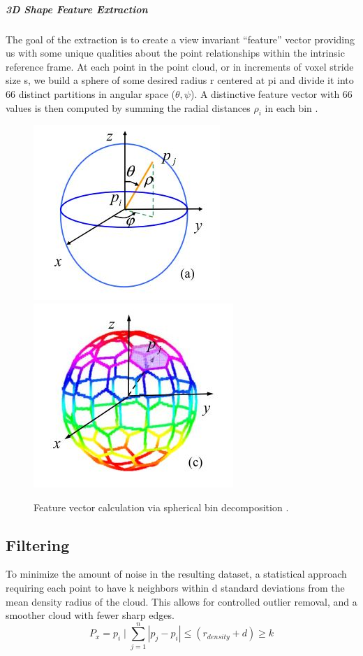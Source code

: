 \documentclass[12pt]{drexelthesis}
\let\Oldsubsection\subsection
\renewcommand{\subsection}{\FloatBarrier\Oldsubsection}
\begin{document}
\subparagraph{3D Shape Feature Extraction}
The goal of the extraction is to create a view invariant “feature” vector providing us with some unique qualities about the point relationships within the intrinsic reference frame. At each point in the point cloud, or in increments of voxel stride size s, we build a sphere of some desired radius r centered at pi and divide it into 66 distinct partitions in angular space ($\theta, \psi$). A distinctive feature vector with 66 values is then computed by summing the radial distances $\rho_{i}$ in each bin \cite{RN60}.

\begin{figure}[!ht]
	\centering
		\includegraphics{ISSfeaturevector2.jpg}  \includegraphics{ISSfeaturevector.jpg}
	\caption[Intrinsic Shape Signature feature vectors]{\centering Feature vector calculation via spherical bin decomposition \cite{RN60}.}
\end{figure}

\subsection{Filtering}
To minimize the amount of noise in the resulting dataset, a statistical approach requiring each point to have k neighbors within d standard deviations from the mean density radius of the cloud. This allows for controlled outlier removal, and a smoother cloud with fewer sharp edges.
\begin{equation}
	P_{x} = p_{i} \mid \sum_{j=1}^n |p_{j} - p_{i}| \leq (r_{density} + d) \geq k
\end{equation}
\end{document}
